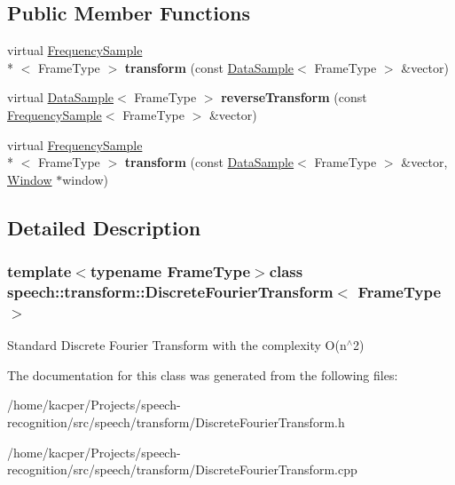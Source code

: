 \subsection*{Public Member Functions}
\begin{DoxyCompactItemize}
\item 
\hypertarget{classspeech_1_1transform_1_1DiscreteFourierTransform_adf478699abd139e4cb3ac83e86f6b058}{virtual \hyperlink{classspeech_1_1raw__data_1_1FrequencySample}{Frequency\+Sample}\\*
$<$ Frame\+Type $>$ {\bfseries transform} (const \hyperlink{classspeech_1_1raw__data_1_1DataSample}{Data\+Sample}$<$ Frame\+Type $>$ \&vector)}\label{classspeech_1_1transform_1_1DiscreteFourierTransform_adf478699abd139e4cb3ac83e86f6b058}

\item 
\hypertarget{classspeech_1_1transform_1_1DiscreteFourierTransform_a106bcc8c2399a69a60e15dd90f222c35}{virtual \hyperlink{classspeech_1_1raw__data_1_1DataSample}{Data\+Sample}$<$ Frame\+Type $>$ {\bfseries reverse\+Transform} (const \hyperlink{classspeech_1_1raw__data_1_1FrequencySample}{Frequency\+Sample}$<$ Frame\+Type $>$ \&vector)}\label{classspeech_1_1transform_1_1DiscreteFourierTransform_a106bcc8c2399a69a60e15dd90f222c35}

\item 
\hypertarget{classspeech_1_1transform_1_1DiscreteFourierTransform_a3db5d48847f7f79afb71f993f7502d9f}{virtual \hyperlink{classspeech_1_1raw__data_1_1FrequencySample}{Frequency\+Sample}\\*
$<$ Frame\+Type $>$ {\bfseries transform} (const \hyperlink{classspeech_1_1raw__data_1_1DataSample}{Data\+Sample}$<$ Frame\+Type $>$ \&vector, \hyperlink{classspeech_1_1transform_1_1window_1_1Window}{Window} $\ast$window)}\label{classspeech_1_1transform_1_1DiscreteFourierTransform_a3db5d48847f7f79afb71f993f7502d9f}

\end{DoxyCompactItemize}


\subsection{Detailed Description}
\subsubsection*{template$<$typename Frame\+Type$>$class speech\+::transform\+::\+Discrete\+Fourier\+Transform$<$ Frame\+Type $>$}

Standard Discrete Fourier Transform with the complexity O(n$^\wedge$2) 

The documentation for this class was generated from the following files\+:\begin{DoxyCompactItemize}
\item 
/home/kacper/\+Projects/speech-\/recognition/src/speech/transform/Discrete\+Fourier\+Transform.\+h\item 
/home/kacper/\+Projects/speech-\/recognition/src/speech/transform/Discrete\+Fourier\+Transform.\+cpp\end{DoxyCompactItemize}
